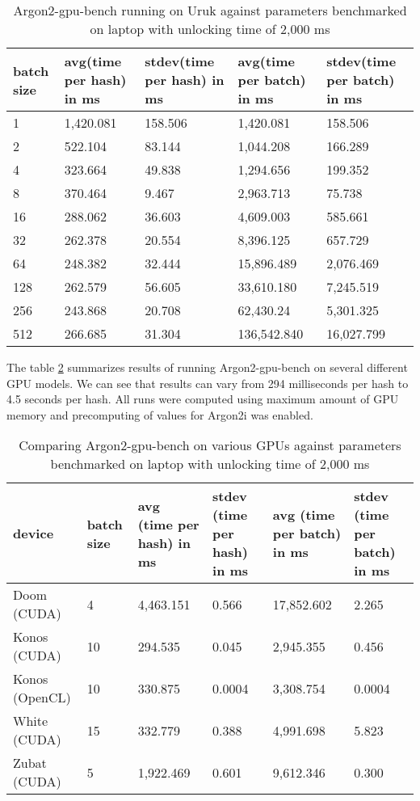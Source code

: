 \documentclass[nolof]{fithesis3}
\begin{document}
\noindent
\begin{table}
\caption{Argon2-gpu-bench running on Uruk against parameters benchmarked on laptop with unlocking time of 2,000 ms}
\label{tab:uruk}
\begin{tabularx}{\textwidth}{| X | X | X | X | X |}
\hline
batch size & avg(time per hash) in ms & stdev(time per hash) in ms & avg(time per batch) in ms & stdev(time per batch) in ms\\
\hline
1 & 1,420.081 & 158.506 & 1,420.081 & 158.506\\
\hline
2 & 522.104 & 83.144 & 1,044.208 & 166.289\\
\hline
4 & 323.664 & 49.838 & 1,294.656 & 199.352\\
\hline
8 & 370.464 & 9.467 & 2,963.713 & 75.738\\
\hline
16 & 288.062 & 36.603 & 4,609.003 & 585.661\\
\hline
32 & 262.378 & 20.554 & 8,396.125 & 657.729\\
\hline
64 & 248.382 & 32.444 & 15,896.489 & 2,076.469\\
\hline
128 & 262.579 & 56.605 & 33,610.180 & 7,245.519\\
\hline
256 & 243.868 & 20.708 & 62,430.24 & 5,301.325\\
\hline
512 & 266.685 & 31.304 & 136,542.840 & 16,027.799\\
\hline
\end{tabularx}
\end{table}

The table \ref{tab:gpus} summarizes results of running Argon2-gpu-bench on several different GPU models. We can see that results can vary from 294 milliseconds per hash to 4.5 seconds per hash. All runs were computed using maximum amount of GPU memory and precomputing of values for Argon2i was enabled.

\noindent
\begin{table}
\caption{Comparing Argon2-gpu-bench on various GPUs against parameters benchmarked on laptop with unlocking time of 2,000 ms}
\label{tab:gpus}
\begin{tabularx}{\textwidth}{| X | X | X | X | X | X |}
\hline
device & batch size & avg (time per hash) in ms & stdev (time per hash) in ms & avg (time per batch) in ms & stdev (time per batch) in ms\\
\hline
Doom (CUDA) & 4 & 4,463.151 & 0.566 & 17,852.602 & 2.265\\
\hline
Konos (CUDA) & 10 & 294.535 & 0.045 & 2,945.355 & 0.456\\
\hline
Konos (OpenCL) & 10 & 330.875 & 0.0004 & 3,308.754 & 0.0004\\
\hline
White  (CUDA) & 15 & 332.779 & 0.388 & 4,991.698 & 5.823\\
\hline
Zubat (CUDA) & 5 & 1,922.469 & 0.601 & 9,612.346 &0.300\\
\hline
\end{tabularx}
\end{table}
\end{document}
